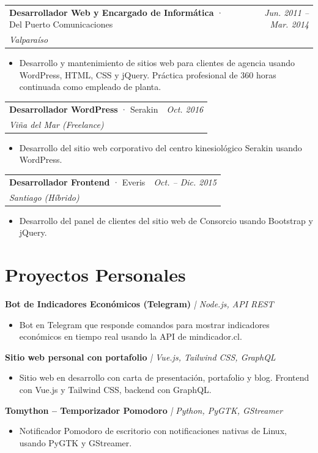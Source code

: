 \documentclass[a4paper,11pt]{article}
\makeatletter
\newcommand{\entrada}[4]{%
  \vspace{6pt}
  \begin{tabularx}{\textwidth}{@{}X r@{}}
    \textbf{#1} \textcolor{gris}{· #2} & \textcolor{grisCLaro}{\small\textit{#4}} \\
    \textcolor{grisCLaro}{\small\textit{#3}} & \\
  \end{tabularx}
  \vspace{2pt}
}
\newcommand{\proyecto}[2]{%
  \vspace{6pt}
  \textbf{#1} \quad \textcolor{gris}{\small\textit{| #2}}
  \vspace{2pt}
}
\makeatother
\begin{document}
\entrada{Desarrollador Web y Encargado de Informática}{Del Puerto Comunicaciones}{Valparaíso}{Jun. 2011 -- Mar. 2014}
\begin{itemize}
  \item Desarrollo y mantenimiento de sitios web para clientes de agencia usando WordPress, HTML, CSS y jQuery. Práctica profesional de 360 horas continuada como empleado de planta.
\end{itemize}

\entrada{Desarrollador WordPress}{Serakin}{Viña del Mar (Freelance)}{Oct. 2016}
\begin{itemize}
  \item Desarrollo del sitio web corporativo del centro kinesiológico Serakin usando WordPress.
\end{itemize}

\entrada{Desarrollador Frontend}{Everis}{Santiago (Híbrido)}{Oct. -- Dic. 2015}
\begin{itemize}
  \item Desarrollo del panel de clientes del sitio web de Consorcio usando Bootstrap y jQuery.
\end{itemize}

\section{Proyectos Personales}

\proyecto{Bot de Indicadores Económicos (Telegram)}{Node.js, API REST}
\begin{itemize}
  \item Bot en Telegram que responde comandos para mostrar indicadores económicos en tiempo real usando la API de mindicador.cl.
\end{itemize}

\proyecto{Sitio web personal con portafolio}{Vue.js, Tailwind CSS, GraphQL}
\begin{itemize}
  \item Sitio web en desarrollo con carta de presentación, portafolio y blog. Frontend con Vue.js y Tailwind CSS, backend con GraphQL.
\end{itemize}

\proyecto{Tomython -- Temporizador Pomodoro}{Python, PyGTK, GStreamer}
\begin{itemize}
  \item Notificador Pomodoro de escritorio con notificaciones nativas de Linux, usando PyGTK y GStreamer.
\end{itemize}
\end{document}
